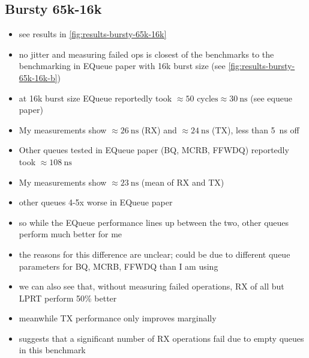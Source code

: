 \subsection{Bursty 65k-16k}
\begin{itemize}
    \item see results in \autoref{fig:results-bursty-65k-16k}
    \item no jitter and measuring failed ops is closest of the benchmarks to the benchmarking in EQueue paper
        with 16k burst size (see \autoref{fig:results-bursty-65k-16k-b})
    \item at 16k burst size EQueue reportedly took $\approx 50\text{ cycles} \approx \SI{30}{\nano\second}$
        (see equeue paper)
    \item My measurements show $\approx \SI{26}{\nano\second}$ (RX) and $\approx \SI{24}{\nano\second}$ (TX),
        less than \SI{5}{\nano\second} off
    \item Other queues tested in EQueue paper (BQ, MCRB, FFWDQ) reportedly took $\approx \SI{108}{\nano\second}$
    \item My measurements show $\approx \SI{23}{\nano\second}$ (mean of RX and TX)
    \item other queues 4-5x worse in EQueue paper
    \item so while the EQueue performance lines up between the two, other queues perform much better for me
    \item the reasons for this difference are unclear; could be due to different queue parameters for BQ, MCRB, FFWDQ than I am using
    \item we can also see that, without measuring failed operations, RX of all but LPRT perform 50\% better
    \item meanwhile TX performance only improves marginally
    \item suggests that a significant number of RX operations fail due to empty queues in this benchmark
\end{itemize}

